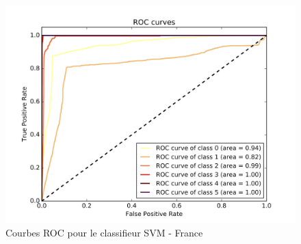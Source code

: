 \documentclass{book}
\begin{document}
\begin{figure}[H]
 \begin{center}
\includegraphics[scale=0.4]{../../data/France/test/Support_Vector_Gaussian_Classification/Support_Vector_Gaussian_Classification_roc.png}
 \caption{Courbes ROC pour le classifieur SVM - France}
 \label{svm_roc}
 \end{center}
\end{figure}
\end{document}
